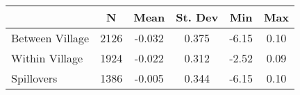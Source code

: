 \begin{tabular}{l*{5}{c}}\hline&\multicolumn{1}{c}{N}&\multicolumn{1}{c}{Mean}&\multicolumn{1}{c}{St. Dev}&\multicolumn{1}{c}{Min}&\multicolumn{1}{c}{Max}\\ \hline 
Between Village & 2126 & -0.032 & 0.375 & -6.15 & 0.10 \\
Within Village & 1924 & -0.022 & 0.312 & -2.52 & 0.09 \\
Spillovers & 1386 & -0.005 & 0.344 & -6.15 & 0.10 \\
\hline \end{tabular}
